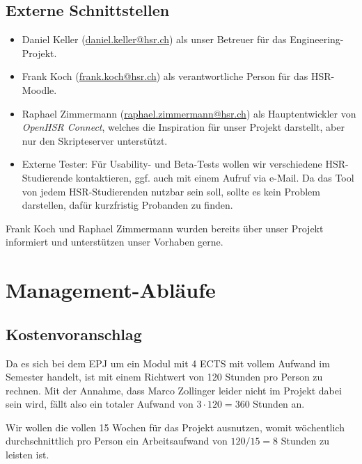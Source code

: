 \documentclass[a4paper]{article}
\begin{document}
\subsection{Externe Schnittstellen}


\begin{itemize}
  \item Daniel Keller (\url{daniel.keller@hsr.ch}) als unser Betreuer für das Engineering-Projekt.
  \item Frank Koch (\url{frank.koch@hsr.ch}) als verantwortliche Person für das HSR-Moodle.
  \item Raphael Zimmermann (\url{raphael.zimmermann@hsr.ch}) als Hauptentwickler
    von \emph{OpenHSR Connect}, welches die
    Inspiration für unser Projekt darstellt, aber nur den Skripteserver
    unterstützt.
  \item Externe Tester: Für Usability- und Beta-Tests wollen wir verschiedene
    HSR-Studierende kontaktieren, ggf. auch mit einem Aufruf via e-Mail. Da das
    Tool von jedem HSR-Studierenden nutzbar sein soll, sollte es kein Problem
    darstellen, dafür kurzfristig Probanden zu finden.
\end{itemize}

Frank Koch und Raphael Zimmermann wurden bereits über unser Projekt informiert
und unterstützen unser Vorhaben gerne.

\section{Management-Abläufe}
\subsection{Kostenvoranschlag}

Da es sich bei dem EPJ um ein Modul mit 4 ECTS mit vollem Aufwand im Semester handelt, ist mit einem Richtwert von 120 Stunden pro Person zu rechnen.
Mit der Annahme, dass Marco Zollinger leider nicht im Projekt dabei sein wird,
fällt also ein totaler Aufwand von $3 \cdot 120 = 360$ Stunden an.

Wir wollen die vollen 15 Wochen für das Projekt ausnutzen, womit wöchentlich
durchschnittlich pro Person ein Arbeitsaufwand von $120 / 15 = 8$ Stunden zu
leisten ist.
\end{document}
